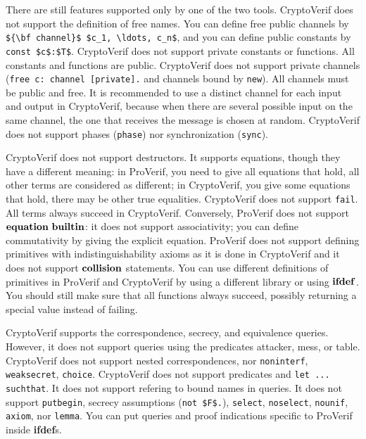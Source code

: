 \documentclass{book}
\begin{document}
There are still features supported only by one of the two tools.
CryptoVerif does not support the definition of free names. You can
define free public channels by
\lstinline!${\bf channel}$ $c_1, \ldots, c_n$!,
and you can define public constants by
\lstinline!const $c$:$T$!.
%
CryptoVerif does not support private constants or functions. All
constants and functions are public.
%
CryptoVerif does not support private channels (\lstinline!free c: channel [private].! and channels bound by \lstinline!new!). All channels must be public and free. It is recommended to use a distinct channel for each input and output in CryptoVerif, because when there are several possible input on the same channel, the one that receives the message is chosen at random.
%
CryptoVerif does not support phases (\lstinline!phase!) nor synchronization (\lstinline!sync!).

CryptoVerif does not support destructors. It supports equations, though
they have a different meaning: in ProVerif, you need to give all
equations that hold, all other terms are considered as different;
in CryptoVerif, you give some equations that hold,
there may be other true equalities.
%
CryptoVerif does not support \lstinline!fail!. All terms always succeed
in CryptoVerif.
%
Conversely, ProVerif does not support ${\bf equation}\ {\bf builtin}$: it
does not support associativity; you can define commutativity by giving
the explicit equation. ProVerif does not support defining primitives with
indistinguishability axioms as it is done in CryptoVerif and
it does not support ${\bf collision}$ statements.
%
You can use different definitions of primitives in ProVerif and CryptoVerif
by using a different library or using $\bf ifdef$.
You should still make sure that all functions
always succeed, possibly returning a special value instead of failing.

CryptoVerif supports the correspondence, secrecy, and equivalence queries. However,
it does not support queries using the predicates attacker, mess, or table.
CryptoVerif does not support nested correspondences, nor
\lstinline!noninterf!, \lstinline!weaksecret!, \lstinline!choice!.
%
CryptoVerif does not support predicates and \lstinline!let ... suchthat!.
It does not support refering to bound names in queries.
It does not support \lstinline!putbegin!,
secrecy assumptions (\lstinline!not $F$.!), \lstinline!select!, \lstinline!noselect!, \lstinline!nounif!,
\lstinline!axiom!, nor \lstinline!lemma!.
%
You can put queries and proof indications specific to ProVerif inside
{\bf ifdef}s.
\end{document}
